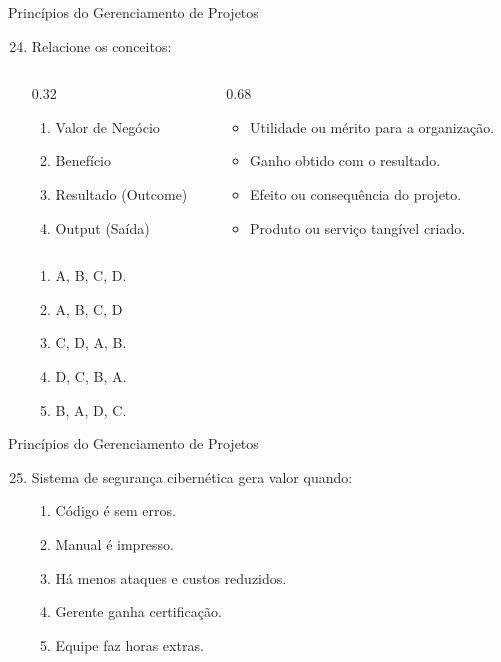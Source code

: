 \documentclass{beamer}
\begin{document}
\begin{frame}{Princípios do Gerenciamento de Projetos}
	\begin{enumerate}
		\setcounter{enumi}{23}
		\justifying
		\item Relacione os conceitos:
		\begin{columns}
			\begin{column}{0.32\textwidth}
				\begin{enumerate}[A]
					\item Valor de Negócio
					\item Benefício
					\item Resultado (Outcome)
					\item Output (Saída)
				\end{enumerate}
			\end{column}
			\begin{column}{0.68\textwidth}
				\begin{itemize}
					\item Utilidade ou mérito para a organização.
					\item Ganho obtido com o resultado.
					\item Efeito ou consequência do projeto.
					\item Produto ou serviço tangível criado.
				\end{itemize}
			\end{column}
		\end{columns}
		\begin{enumerate}[a]
			\item A, B, C, D.
			\item \alert<2>{A, B, C, D}
			\item C, D, A, B.
			\item D, C, B, A.
			\item B, A, D, C.
		\end{enumerate}
	\end{enumerate}
\end{frame}

\begin{frame}{Princípios do Gerenciamento de Projetos}
	\begin{enumerate}
		\setcounter{enumi}{24}
		\justifying
		\item Sistema de segurança cibernética gera valor quando:
		\begin{enumerate}[a]
			\item Código é sem erros.
			\item Manual é impresso.
			\item \alert<2>{Há menos ataques e custos reduzidos.}
			\item Gerente ganha certificação.
			\item Equipe faz horas extras.
		\end{enumerate}
	\end{enumerate}
\end{frame}
\end{document}
